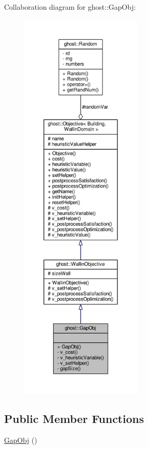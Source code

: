 Collaboration diagram for ghost\-:\-:Gap\-Obj\-:
\nopagebreak
\begin{figure}[H]
\begin{center}
\leavevmode
\includegraphics[height=550pt]{classghost_1_1GapObj__coll__graph}
\end{center}
\end{figure}
\subsection*{Public Member Functions}
\begin{DoxyCompactItemize}
\item 
\hyperlink{classghost_1_1GapObj_a9b1139edad4eb82edab5e135e1257f72}{Gap\-Obj} ()
\end{DoxyCompactItemize}
